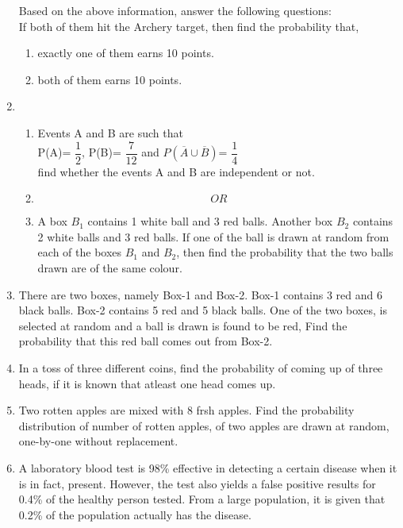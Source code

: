 \documentclass[a4paper,12pt]{article}
\begin{document}
\begin{enumerate}
Based on the above information, answer the following questions: \\
If both of them hit the Archery target, then find the probability that,\
\begin{enumerate}
\item exactly one of them earns 10 points. 

\item both of them earns 10 points.

\end{enumerate}

\item \begin{enumerate}
\item Events A and B are such that\\
P(A)= $\dfrac{1}{2}$, P(B)= $\dfrac{7}{12}$ and $P(\overline A \cup \overline B)$= $\dfrac{1}{4}$ \\
find whether the events A and B are independent  or not. 

\item [ ]$$ OR $$

\item A box $B_1$ contains 1 white ball and 3 red balls. Another box  $B_2$ contains 2 white balls and 3 red balls. If one of the ball is drawn at random from each of the boxes  $B_1$ and  $B_2$, then find the probability that the two balls drawn are of the same colour.
\end{enumerate}

\item There are two boxes, namely Box-1 and Box-2. Box-1 contains 3 red and 6 black balls. Box-2 contains 5 red and 5 black balls. One of the two boxes, is selected at random and a ball is drawn is found to be red, Find the probability that this red ball comes out from Box-2.

\item In a toss of  three different coins, find the probability of coming up of three heads, if it is known that atleast one  head comes up.

\item Two rotten apples are mixed with 8 frsh apples. Find the probability distribution of number of rotten apples, of two apples are drawn at random, one-by-one without replacement.

\item A laboratory blood test is 98\% effective in detecting a certain disease when it is in fact, present. However, the test also yields a false positive results for 0.4\% of the healthy person tested. From a large population, it is given that 0.2\% of the population actually has the disease.\


\end{enumerate}
\end{document}
